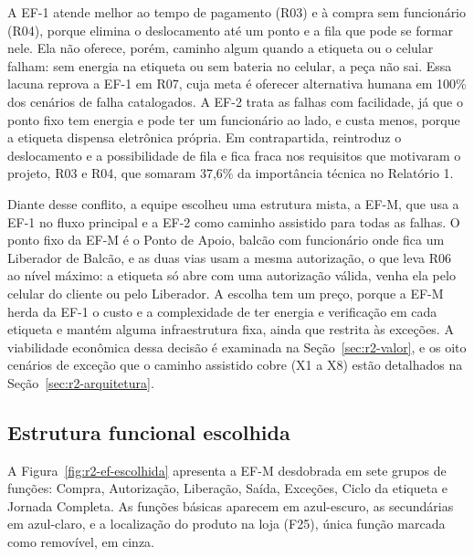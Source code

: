 A EF-1 atende melhor ao tempo de pagamento (R03) e à compra sem funcionário (R04), porque elimina o deslocamento até um ponto e a fila que pode se formar nele. Ela não oferece, porém, caminho algum quando a etiqueta ou o celular falham: sem energia na etiqueta ou sem bateria no celular, a peça não sai. Essa lacuna reprova a EF-1 em R07, cuja meta é oferecer alternativa humana em 100\% dos cenários de falha catalogados. A EF-2 trata as falhas com facilidade, já que o ponto fixo tem energia e pode ter um funcionário ao lado, e custa menos, porque a etiqueta dispensa eletrônica própria. Em contrapartida, reintroduz o deslocamento e a possibilidade de fila e fica fraca nos requisitos que motivaram o projeto, R03 e R04, que somaram 37,6\% da importância técnica no Relatório 1.

Diante desse conflito, a equipe escolheu uma estrutura mista, a EF-M, que usa a EF-1 no fluxo principal e a EF-2 como caminho assistido para todas as falhas. O ponto fixo da EF-M é o Ponto de Apoio, balcão com funcionário onde fica um Liberador de Balcão, e as duas vias usam a mesma autorização, o que leva R06 ao nível máximo: a etiqueta só abre com uma autorização válida, venha ela pelo celular do cliente ou pelo Liberador. A escolha tem um preço, porque a EF-M herda da EF-1 o custo e a complexidade de ter energia e verificação em cada etiqueta e mantém alguma infraestrutura fixa, ainda que restrita às exceções. A viabilidade econômica dessa decisão é examinada na Seção~\ref{sec:r2-valor}, e os oito cenários de exceção que o caminho assistido cobre (X1 a X8) estão detalhados na Seção~\ref{sec:r2-arquitetura}.

\subsection{Estrutura funcional escolhida}
\label{sub:r2-ef-escolhida}

A Figura~\ref{fig:r2-ef-escolhida} apresenta a EF-M desdobrada em sete grupos de funções: Compra, Autorização, Liberação, Saída, Exceções, Ciclo da etiqueta e Jornada Completa. As funções básicas aparecem em azul-escuro, as secundárias em azul-claro, e a localização do produto na loja (F25), única função marcada como removível, em cinza.

